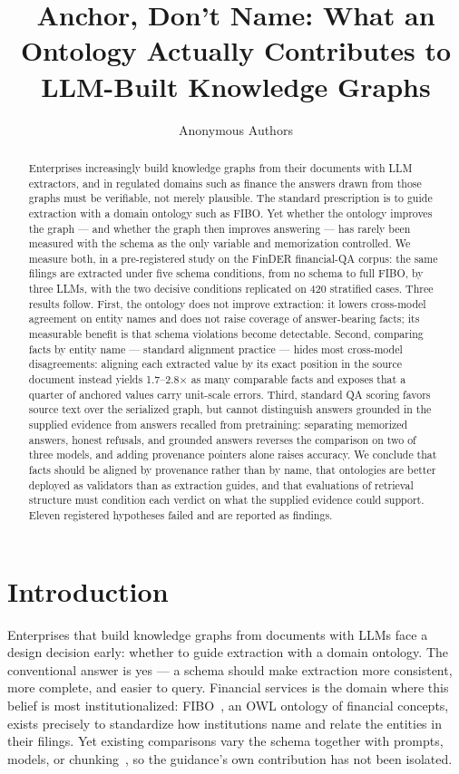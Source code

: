 \documentclass{article}
\title{Anchor, Don't Name: What an Ontology Actually Contributes to LLM-Built Knowledge Graphs}
\author{Anonymous Authors}
\begin{document}
\maketitle

\begin{abstract}
Enterprises increasingly build knowledge graphs from their documents with
LLM extractors, and in regulated domains such as finance the answers drawn
from those graphs must be verifiable, not merely plausible. The standard
prescription is to guide extraction with a domain ontology such as FIBO.
Yet whether the ontology improves the graph --- and whether the graph then
improves answering --- has rarely been measured with the schema as the only
variable and memorization controlled. We measure both, in a pre-registered
study on the FinDER financial-QA corpus: the same filings are extracted
under five schema conditions, from no schema to full FIBO, by three LLMs,
with the two decisive conditions replicated on 420 stratified cases. Three
results follow. First, the ontology does not improve extraction: it lowers
cross-model agreement on entity names and does not raise coverage of
answer-bearing facts; its measurable benefit is that schema violations
become detectable. Second, comparing facts by entity name --- standard
alignment practice --- hides most cross-model disagreements: aligning each
extracted value by its exact position in the source document instead
yields 1.7--2.8$\times$ as many comparable facts and exposes that a quarter of anchored values carry
unit-scale errors. Third, standard QA scoring favors source text over the
serialized graph, but cannot distinguish answers grounded in the supplied evidence from answers recalled from pretraining: separating
memorized answers, honest refusals, and grounded answers reverses the
comparison on two of three models, and adding provenance pointers alone
raises accuracy. We conclude that facts should be aligned by provenance rather than by
name, that ontologies are better deployed as validators than as
extraction guides, and that evaluations of retrieval structure must
condition each verdict on what the supplied evidence could support. Eleven registered hypotheses failed and are reported as findings.
\end{abstract}

\section{Introduction}\label{sec:intro}

Enterprises that build knowledge graphs from documents with LLMs face a
design decision early: whether to guide extraction with a domain ontology.
The conventional answer is yes --- a schema should make extraction more consistent,
more complete, and easier to query. Financial services is the domain where
this belief is most institutionalized: FIBO~\citep{fibo}, an OWL ontology of financial concepts, exists
precisely to
standardize how institutions name and relate the entities in their
filings. Yet existing comparisons vary the schema together with prompts,
models, or chunking~\citep{graphrag, lightrag, ragvsgraphrag}, so the
guidance's own contribution has not been isolated.
\end{document}
